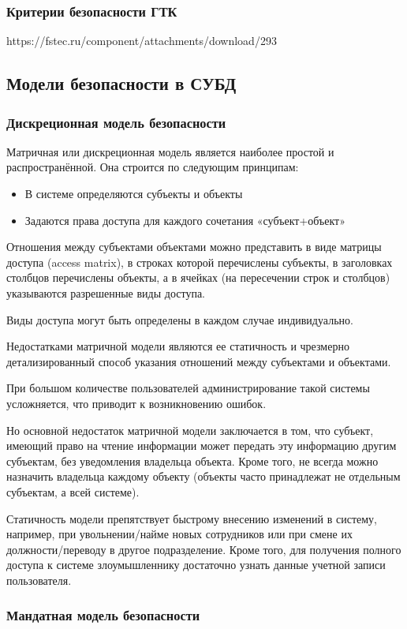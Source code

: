 \subsubsection{Критерии безопасности ГТК}
https://fstec.ru/component/attachments/download/293


\subsection{Модели безопасности в СУБД}
\subsubsection{Дискреционная модель безопасности}
Матричная или дискреционная модель является наиболее простой и распространённой. Она строится по следующим принципам:
\begin{itemize}
	\item В системе определяются субъекты и объекты
	\item Задаются права доступа для каждого сочетания «субъект+объект»
\end{itemize}
Отношения между субъектами объектами можно представить в виде матрицы доступа (access matrix), в строках которой перечислены субъекты, в заголовках столбцов перечислены объекты, а в ячейках (на пересечении строк и столбцов) указываются разрешенные виды доступа.

Виды доступа могут быть определены в каждом случае индивидуально.

Недостатками матричной модели являются ее статичность и чрезмерно детализированный способ указания отношений между субъектами и объектами.

При большом количестве пользователей администрирование такой системы усложняется, что приводит к возникновению ошибок.

Но основной недостаток матричной модели заключается в том, что субъект, имеющий право на чтение информации может передать эту информацию другим субъектам, без уведомления владельца объекта. Кроме того, не всегда можно назначить владельца каждому объекту (объекты часто принадлежат не отдельным субъектам, а всей системе).

Статичность модели препятствует быстрому внесению изменений в систему, например, при увольнении/найме новых сотрудников или при смене их должности/переводу в другое подразделение.
Кроме того, для получения полного доступа к системе злоумышленнику достаточно узнать данные учетной записи пользователя. 

\subsubsection{Мандатная модель безопасности}

